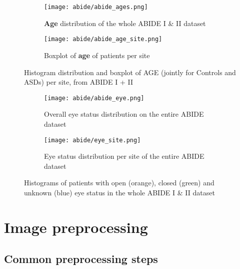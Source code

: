 \documentclass[10pt]{report}
\begin{document}
\begin{figure}
\centering
\begin{subfigure}{0.5\textwidth}
\texttt{[image: abide/abide\_ages.png]}
\caption{\textbf{Age} distribution of the whole ABIDE I \& II dataset}
\label{fig:abideages}
\end{subfigure}

\begin{subfigure}{0.9\textwidth}
\texttt{[image: abide/abide\_age\_site.png]}
\caption{Boxplot of \textbf{age} of patients per site}
\label{fig:abide_age_site}
\end{subfigure}
\caption{Histogram distribution and boxplot of AGE (jointly for Controls and ASDs) per site, from ABIDE I + II}
\label{}
\end{figure}





\begin{figure}
\begin{subfigure}{0.4\linewidth}
\texttt{[image: abide/abide\_eye.png]}
\caption{Overall eye status distribution on the entire ABIDE dataset}
\label{fig:abideeye}
\end{subfigure}
\begin{subfigure}{0.7\linewidth}
\texttt{[image: abide/eye\_site.png]}
\caption{Eye status distribution per site of the entire ABIDE dataset}
\label{fig:abideeyesite}
\end{subfigure}
\hspace{0.1 cm}
\caption{Histograms of patients with open (orange), closed (green) and unknown (blue) eye status in the whole ABIDE I \& II dataset}
\label{}
\end{figure}







\chapter{Image preprocessing}
\section{Common preprocessing steps}
\label{sec:preprocessing_steps}
\end{document}
